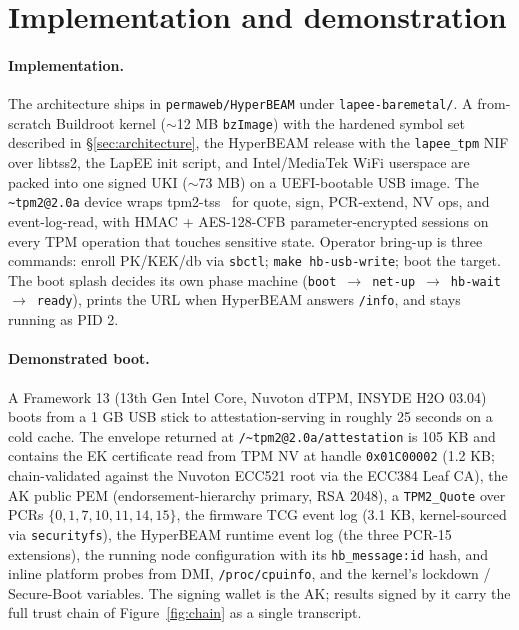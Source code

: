 \documentclass[10pt,a4paper]{article}
\begin{document}
\section{Implementation and demonstration}
\label{sec:implementation}
\vspace{-0.3em}

\paragraph{Implementation.} The architecture ships in
\texttt{permaweb/HyperBEAM} under \texttt{lapee-baremetal/}. A
from-scratch Buildroot kernel ($\sim$12 MB \texttt{bzImage}) with the
hardened symbol set described in \S\ref{sec:architecture}, the
HyperBEAM release with the \texttt{lapee\_tpm} NIF over libtss2, the
LapEE init script, and Intel/MediaTek WiFi userspace are packed into
one signed UKI ($\sim$73 MB) on a UEFI-bootable USB image. The
\texttt{\~{}tpm2@2.0a} device wraps tpm2-tss~\cite{tpm2-tss} for
quote, sign, PCR-extend, NV ops, and event-log-read, with HMAC +
AES-128-CFB parameter-encrypted sessions on every TPM operation that
touches sensitive state. Operator bring-up is three commands: enroll
PK/KEK/db via \texttt{sbctl}; \texttt{make hb-usb-write}; boot the
target. The boot splash decides its own phase machine
(\texttt{boot}~$\rightarrow$~\texttt{net-up}~$\rightarrow$~\texttt{hb-wait}~$\rightarrow$~\texttt{ready}),
prints the URL when HyperBEAM answers \texttt{/info}, and stays
running as PID 2.

\paragraph{Demonstrated boot.} A Framework 13 (13th Gen Intel Core,
Nuvoton dTPM, INSYDE H2O 03.04) boots from a 1 GB USB stick to
attestation-serving in roughly 25 seconds on a cold cache. The
envelope returned at \texttt{/\~{}tpm2@2.0a/attestation} is 105 KB
and contains the EK certificate read from TPM NV at handle
\texttt{0x01C00002} (1.2 KB; chain-validated against the Nuvoton
ECC521 root via the ECC384 Leaf CA), the AK public PEM
(endorsement-hierarchy primary, RSA 2048), a \texttt{TPM2\_Quote}
over PCRs $\{0,1,7,10,11,14,15\}$, the firmware TCG event log (3.1
KB, kernel-sourced via \texttt{securityfs}), the HyperBEAM runtime
event log (the three PCR-15 extensions), the running node
configuration with its \texttt{hb\_message:id} hash, and inline
platform probes from DMI, \texttt{/proc/cpuinfo}, and the kernel's
lockdown / Secure-Boot variables. The signing wallet is the AK;
results signed by it carry the full trust chain of
Figure~\ref{fig:chain} as a single transcript.
\end{document}
